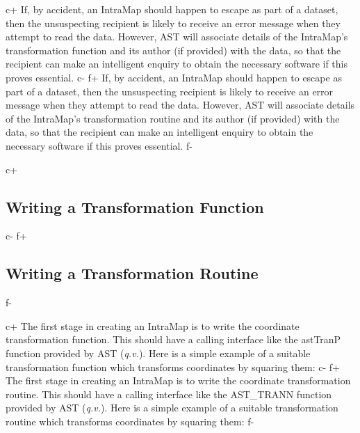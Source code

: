 \documentclass[twoside,11pt]{article}
\newcommand{\xlabel}[1]{}
\begin{document}
c+
If, by accident, an IntraMap should happen to escape as part of a
dataset, then the unsuspecting recipient is likely to receive an error
message when they attempt to read the data. However, AST will
associate details of the IntraMap's transformation function and its
author (if provided) with the data, so that the recipient can make an
intelligent enquiry to obtain the necessary software if this proves
essential.
c-
f+
If, by accident, an IntraMap should happen to escape as part of a
dataset, then the unsuspecting recipient is likely to receive an error
message when they attempt to read the data. However, AST will
associate details of the IntraMap's transformation routine and its
author (if provided) with the data, so that the recipient can make an
intelligent enquiry to obtain the necessary software if this proves
essential.
f-

c+
\subsection{\label{ss:transformationfunctions}Writing a Transformation Function}
c-
f+
\subsection{\label{ss:transformationfunctions}Writing a Transformation Routine}
f-

c+
The first stage in creating an IntraMap is to write the coordinate
transformation function. This should have a calling interface like the
astTranP function provided by AST ({\em{q.v.}}). Here is a simple
example of a suitable transformation function which transforms
coordinates by squaring them:
c-
f+
The first stage in creating an IntraMap is to write the coordinate
transformation routine. This should have a calling interface like the
AST\_TRANN function provided by AST ({\em{q.v.}}). Here is a simple
example of a suitable transformation routine which transforms
coordinates by squaring them:
f-
\xlabel{SqrTran}
\end{document}
